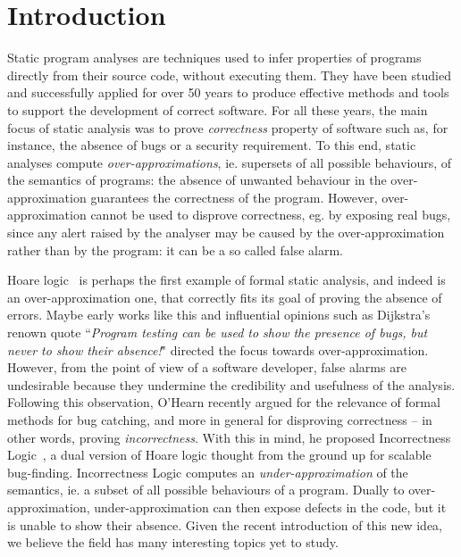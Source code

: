 
\chapter{Introduction}\label{ch:intro}
Static program analyses are techniques used to infer properties of programs directly from their source code, without executing them. They have been studied and successfully applied for over 50 years to produce effective methods and tools to support the development of correct software.
For all these years, the main focus of static analysis was to prove \emph{correctness} property of software such as, for instance, the absence of bugs or a security requirement. To this end, static analyses compute \emph{over-approximations}, ie. supersets of all possible behaviours, of the semantics of programs: the absence of unwanted behaviour in the over-approximation guarantees the correctness of the program. However, over-approximation cannot be used to disprove correctness, eg. by exposing real bugs, since any alert raised by the analyser may be caused by the over-approximation rather than by the program: it can be a so called false alarm.

Hoare logic~\cite{Hoare69} is perhaps the first example of formal static analysis, and indeed is an over-approximation one, that correctly fits its goal of proving the absence of errors. Maybe early works like this and influential opinions such as Dijkstra's renown quote ``\textit{Program testing can be used to show the presence of bugs, but never to show their absence!}" \cite{EWD249} directed the focus towards over-approximation.
However, from the point of view of a software developer, false alarms are undesirable because they undermine the credibility and usefulness of the analysis.
Following this observation, O'Hearn recently argued for the relevance of formal methods for bug catching, and more in general for disproving correctness -- in other words, proving \emph{incorrectness}. With this in mind, he proposed Incorrectness Logic~\cite{OHearn20}, a dual version of Hoare logic thought from the ground up for scalable bug-finding.
Incorrectness Logic computes an \emph{under-approximation} of the semantics, ie. a subset of all possible behaviours of a program. Dually to over-approximation, under-approximation can then expose defects in the code, but it is unable to show their absence.
Given the recent introduction of this new idea, we believe the field has many interesting topics yet to study.

